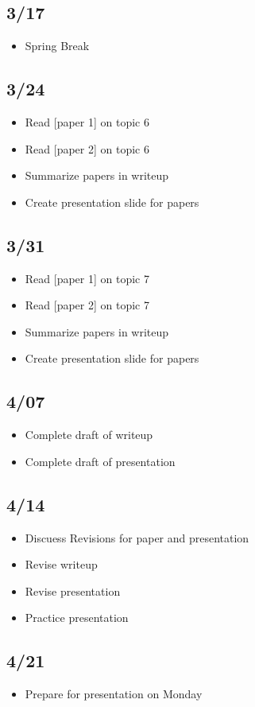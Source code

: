 \documentclass[12pt]{article}
\begin{document}
\subsection*{3/17}
\begin{itemize}
    \item Spring Break
\end{itemize}

\subsection*{3/24}
\begin{itemize}
    \item Read [paper 1] on topic 6
    \item Read [paper 2] on topic 6
    \item Summarize papers in writeup
    \item Create presentation slide for papers
\end{itemize}

\subsection*{3/31}
\begin{itemize}
    \item Read [paper 1] on topic 7
    \item Read [paper 2] on topic 7
    \item Summarize papers in writeup
    \item Create presentation slide for papers
\end{itemize}

\subsection*{4/07}
\begin{itemize}
    \item Complete draft of writeup
    \item Complete draft of presentation
\end{itemize}

\subsection*{4/14}
\begin{itemize}
    \item Discuess Revisions for paper and presentation
    \item Revise writeup
    \item Revise presentation
    \item Practice presentation
\end{itemize}

\subsection*{4/21}
\begin{itemize}
    \item Prepare for presentation on Monday
\end{itemize}
\end{document}
